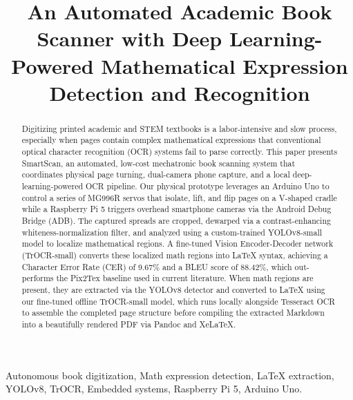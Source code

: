 \documentclass[conference]{IEEEtran}
\begin{document}
\title{An Automated Academic Book Scanner with Deep Learning-Powered Mathematical Expression Detection and Recognition}

\author{
}

\maketitle

\begin{abstract}
Digitizing printed academic and STEM textbooks is a labor-intensive and slow process, especially when pages contain complex mathematical expressions that conventional optical character recognition (OCR) systems fail to parse correctly. This paper presents SmartScan, an automated, low-cost mechatronic book scanning system that coordinates physical page turning, dual-camera phone capture, and a local deep-learning-powered OCR pipeline. Our physical prototype leverages an Arduino Uno to control a series of MG996R servos that isolate, lift, and flip pages on a V-shaped cradle while a Raspberry Pi 5 triggers overhead smartphone cameras via the Android Debug Bridge (ADB). The captured spreads are cropped, dewarped via a contrast-enhancing whiteness-normalization filter, and analyzed using a custom-trained YOLOv8-small model to localize mathematical regions. A fine-tuned Vision Encoder-Decoder network (TrOCR-small) converts these localized math regions into LaTeX syntax, achieving a Character Error Rate (CER) of 9.67\% and a BLEU score of 88.42\%, which out-performs the Pix2Tex baseline used in current literature. When math regions are present, they are extracted via the YOLOv8 detector and converted to LaTeX using our fine-tuned offline TrOCR-small model, which runs locally alongside Tesseract OCR to assemble the completed page structure before compiling the extracted Markdown into a beautifully rendered PDF via Pandoc and XeLaTeX.
\end{abstract}

\begin{IEEEkeywords}
Autonomous book digitization, Math expression detection, LaTeX extraction, YOLOv8, TrOCR, Embedded systems, Raspberry Pi 5, Arduino Uno.
\end{IEEEkeywords}
\end{document}

